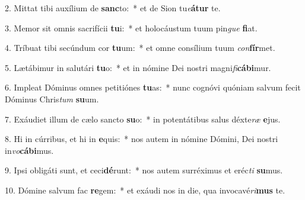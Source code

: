 2. Mittat tibi auxílium de \textbf{sanc}to:~*  et de Sion tu\textit{e}\textbf{á}\textbf{tur} te.\

3. Memor sit omnis sacrifícii \textbf{tu}i:~*  et holocáustum tuum pin\textit{gue} \textbf{fi}at.\

4. Tríbuat tibi secúndum cor \textbf{tu}um:~*  et omne consílium tuum \textit{con}\textbf{fír}met.\

5. Lætábimur in salutári \textbf{tu}o:~*  et in nómine Dei nostri magni\textit{fi}\textbf{cá}\textbf{bi}mur.\

6. Impleat Dóminus omnes petitiónes \textbf{tu}as:~*  nunc cognóvi quóniam salvum fecit Dóminus Chris\textit{tum} \textbf{su}um.\

7. Exáudiet illum de cælo sancto \textbf{su}o:~*  in potentátibus salus déxte\textit{ræ} \textbf{e}jus.\

8. Hi in cúrribus, et hi in \textbf{e}quis:~*  nos autem in nómine Dómini, Dei nostri in\textit{vo}\textbf{cá}\textbf{bi}mus.\

9. Ipsi obligáti sunt, et ceci\textbf{dé}runt:~*  nos autem surréximus et eréc\textit{ti} \textbf{su}mus.\

10. Dómine salvum fac \textbf{re}gem:~*  et exáudi nos in die, qua invocavé\textit{ri}\textbf{mus} te.\

